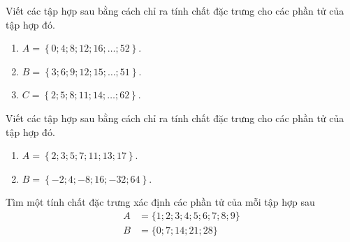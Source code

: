 \begin{vd}%
Viết các tập hợp sau bằng cách chỉ ra tính chất đặc trưng cho các phần tử của tập hợp đó.
\begin{enumerate}
\item $A=\left\lbrace 0;4;8;12;16;\ldots ;52\right\rbrace$.
\item $B=\left\lbrace 3;6;9;12;15;\ldots ;51\right\rbrace$.
\item $C=\left\lbrace 2;5;8;11;14;\ldots ;62\right\rbrace$.
\end{enumerate}
\end{vd}
\begin{vd}%
Viết các tập hợp sau bằng cách chỉ ra tính chất đặc trưng cho các phần tử của tập hợp đó.
\begin{enumerate}
\item $A=\left\lbrace 2;3;5;7;11;13;17\right\rbrace$.
\item $B=\left\lbrace -2;4;-8;16;-32;64\right\rbrace$.
\end{enumerate}
\end{vd}

\begin{vd}
Tìm một tính chất đặc trưng xác định các phần tử của mỗi tập hợp sau
\begin{align*}
	A&=\{1; 2; 3; 4; 5; 6; 7; 8; 9\} \\
	B&=\{0; 7; 14; 21; 28\}
\end{align*}
\end{vd}



